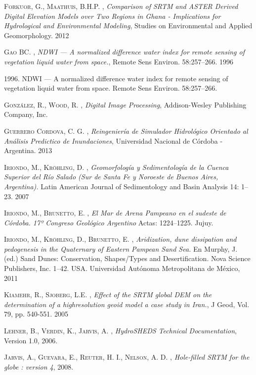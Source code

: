 \begin{thebibliography}{9}
 \textsc{Forkuor, G., Maathuis, B.H.P.} , \textit{Comparison of SRTM and ASTER Derived Digital Elevation Models over Two Regions in Ghana - Implications for Hydrological and Environmental Modeling}, Studies on Environmental and Applied Geomorphology. 2012

 \textsc{Gao BC.} , \textit{NDWI — A normalized difference water index for remote sensing of vegetation liquid water from space.}, Remote Sens Environ. 58:257–266. 1996

 1996. NDWI — A normalized difference water index for remote sensing of vegetation
liquid water from space. Remote Sens Environ. 58:257–266.


 \textsc{González, R., Wood, R.} , \textit{Digital Image Processing}, Addison-Wesley Publishing Company, Inc.

 \textsc{Guerrero Cordova, C. G.} , \textit{Reingeniería de Simulador Hidrológico Orientado al Análisis Predictico de Inundaciones}, Universidad Nacional de Córdoba - Argentina. 2013

 \textsc{Iriondo, M., Kröhling, D.} , \textit{Geomorfología y Sedimentología de la Cuenca Superior del Río Salado (Sur de Santa Fe y Noroeste de Buenos Aires, Argentina).} Latin American Journal of Sedimentology and Basin Analysis 14: 1–23. 2007

 \textsc{Iriondo, M., Brunetto, E.} , \textit{El Mar de Arena Pampeano en el sudeste de Córdoba. 17º Congreso Geológico Argentino} Actas: 1224–1225. Jujuy.

 \textsc{Iriondo, M., Kröhling, D., Brunetto, E.} , \textit{Aridization, dune dissipation and pedogenesis in the Quaternary of Eastern Pampean Sand Sea.} En Murphy, J. (ed.) Sand Dunes: Conservation, Shapes/Types and Desertification. Nova Science Publishers, Inc. 1–42. USA. Universidad Autónoma Metropolitana de México, 2011

 \textsc{Kiamehr, R., Sjoberg, L.E.} , \textit{Effect of the SRTM global DEM on the determination of a highresolution geoid model a case study in Iran.},  J Geod, Vol. 79, pp. 540-551. 2005

 \textsc{Lehner, B., Verdin, K., Jarvis, A.} , \textit{HydroSHEDS Technical Documentation}, Version 1.0, 2006.

 \textsc{Jarvis, A., Guevara, E., Reuter, H. I., Nelson, A. D.} , \textit{Hole-filled SRTM for the globe : version 4}, 2008.


\end{thebibliography}
